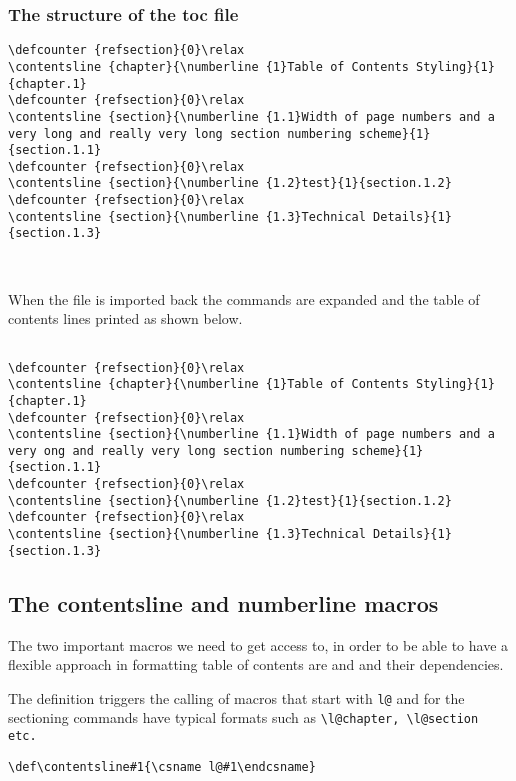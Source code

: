 \subsubsection{The structure of the toc file}

\begin{lstlisting}
\defcounter {refsection}{0}\relax
\contentsline {chapter}{\numberline {1}Table of Contents Styling}{1}{chapter.1}
\defcounter {refsection}{0}\relax
\contentsline {section}{\numberline {1.1}Width of page numbers and a very long and really very long section numbering scheme}{1}{section.1.1}
\defcounter {refsection}{0}\relax
\contentsline {section}{\numberline {1.2}test}{1}{section.1.2}
\defcounter {refsection}{0}\relax
\contentsline {section}{\numberline {1.3}Technical Details}{1}{section.1.3}
\end{lstlisting}
\

When the file is imported back the commands are expanded and the table of contents lines printed as shown below.



\begin{lstlisting}

\defcounter {refsection}{0}\relax
\contentsline {chapter}{\numberline {1}Table of Contents Styling}{1}{chapter.1}
\defcounter {refsection}{0}\relax
\contentsline {section}{\numberline {1.1}Width of page numbers and a very ong and really very long section numbering scheme}{1}{section.1.1}
\defcounter {refsection}{0}\relax
\contentsline {section}{\numberline {1.2}test}{1}{section.1.2}
\defcounter {refsection}{0}\relax
\contentsline {section}{\numberline {1.3}Technical Details}{1}{section.1.3}
\end{lstlisting}

\subsection{The contentsline and numberline macros}

The two important macros we need to get access to, in order to be able to have a flexible approach in formatting table of contents are  and  and their dependencies.

The  definition triggers the calling of macros that start with \verb+l@+ and for the sectioning commands have typical formats such as \lstinline{\l@chapter, \l@section etc.}

\begin{tcolorbox}
\begin{lstlisting}
\def\contentsline#1{\csname l@#1\endcsname}
\end{lstlisting}
\end{tcolorbox}

